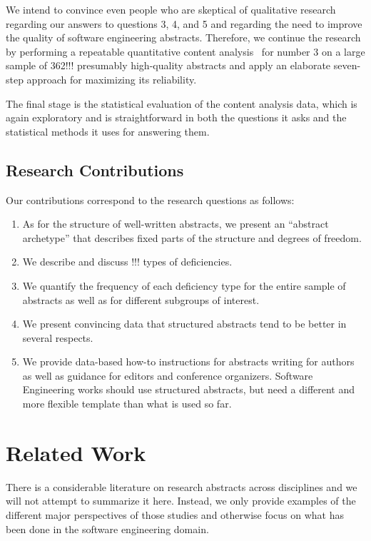 \documentclass[10pt,journal,compsoc]{IEEEtran}
\begin{document}
We intend to convince even people who are skeptical of qualitative research
regarding our answers to questions 3, 4, and 5 and regarding the need to improve
the quality of software engineering abstracts.
Therefore, we continue the research by performing a repeatable
quantitative content analysis~\cite[Ch. 7]{Krippendorff04} for number 3
on a large sample of 362!!! presumably high-quality abstracts
and apply an elaborate seven-step approach for maximizing its reliability.

The final stage is the statistical evaluation of the content analysis data,
which is again exploratory and is straightforward in both
the questions it asks and the statistical methods it uses for answering them.


\subsection{Research Contributions}

Our contributions correspond to the research questions as follows:
\begin{enumerate}
	\item As for the structure of well-written abstracts, we present an ``abstract archetype''
	  that describes fixed parts of the structure and degrees of freedom.
	\item We describe and discuss !!! types of deficiencies.
	\item We quantify the frequency of each deficiency type for the entire sample of abstracts
	  as well as for different subgroups of interest.
	\item We present convincing data that structured abstracts tend to be better
	  in several respects.
	\item We provide data-based how-to instructions for abstracts writing for authors
	  as well as guidance for editors and conference organizers.
	  Software Engineering works should use structured abstracts, but
	  need a different and more flexible template than what is used so far.
\end{enumerate}


\section{Related Work}

There is a considerable literature on research abstracts across disciplines
and we will not attempt to summarize it here.
Instead, we only provide examples of the different major perspectives of those studies
and otherwise focus on what has been done in the software engineering domain.
\end{document}
